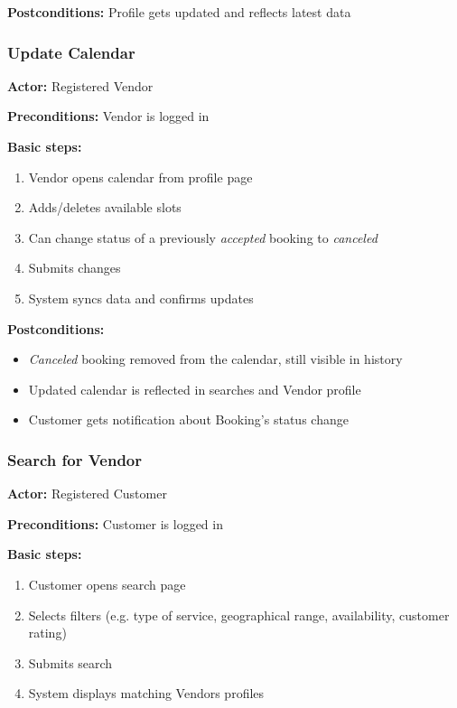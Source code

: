 \documentclass[11pt,a4paper]{article}
\begin{document}
\noindent \textbf{Postconditions:} Profile gets updated and reflects latest data

\subsubsection{Update Calendar}

\textbf{Actor:} Registered Vendor

\noindent \textbf{Preconditions:} Vendor is logged in

\noindent \textbf{Basic steps:}
\begin{enumerate}
  \item Vendor opens calendar from profile page
  \item Adds/deletes available slots
  \item Can change status of a previously \textit{accepted} booking
    to \textit{canceled}
  \item Submits changes
  \item System syncs data and confirms updates
\end{enumerate}

\noindent \textbf{Postconditions:}
\begin{itemize}
  \item \textit{Canceled} booking removed from the calendar, still
    visible in history
  \item Updated calendar is reflected in searches and Vendor profile
  \item Customer gets notification about Booking's status change
\end{itemize}

\subsubsection{Search for Vendor}

\textbf{Actor:} Registered Customer

\noindent \textbf{Preconditions:} Customer is logged in

\noindent \textbf{Basic steps:}
\begin{enumerate}
  \item Customer opens search page
  \item Selects filters (e.g. type of service, geographical range,
    availability, customer rating)
  \item Submits search
  \item System displays matching Vendors profiles
\end{enumerate}
\end{document}

